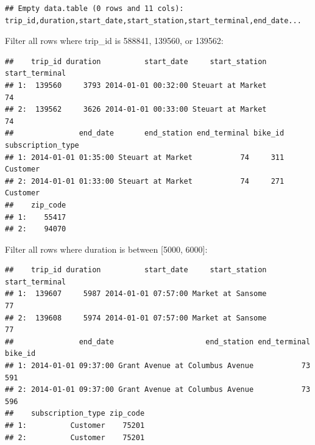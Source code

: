 \documentclass[]{book}
\newenvironment{Shaded}{\begin{snugshade}}{\end{snugshade}}
\newcommand{\DecValTok}[1]{\textcolor[rgb]{0.00,0.00,0.81}{#1}}
\newcommand{\KeywordTok}[1]{\textcolor[rgb]{0.13,0.29,0.53}{\textbf{#1}}}
\newcommand{\NormalTok}[1]{#1}
\newcommand{\OperatorTok}[1]{\textcolor[rgb]{0.81,0.36,0.00}{\textbf{#1}}}
\newcommand{\StringTok}[1]{\textcolor[rgb]{0.31,0.60,0.02}{#1}}
\begin{document}
\begin{verbatim}
## Empty data.table (0 rows and 11 cols): trip_id,duration,start_date,start_station,start_terminal,end_date...
\end{verbatim}

Filter all rows where trip\_id is 588841, 139560, or 139562:

\begin{Shaded}
\end{Shaded}

\begin{verbatim}
##    trip_id duration          start_date     start_station start_terminal
## 1:  139560     3793 2014-01-01 00:32:00 Steuart at Market             74
## 2:  139562     3626 2014-01-01 00:33:00 Steuart at Market             74
##               end_date       end_station end_terminal bike_id subscription_type
## 1: 2014-01-01 01:35:00 Steuart at Market           74     311          Customer
## 2: 2014-01-01 01:33:00 Steuart at Market           74     271          Customer
##    zip_code
## 1:    55417
## 2:    94070
\end{verbatim}

Filter all rows where duration is between {[}5000, 6000{]}:

\begin{Shaded}
\end{Shaded}

\begin{verbatim}
##    trip_id duration          start_date     start_station start_terminal
## 1:  139607     5987 2014-01-01 07:57:00 Market at Sansome             77
## 2:  139608     5974 2014-01-01 07:57:00 Market at Sansome             77
##               end_date                     end_station end_terminal bike_id
## 1: 2014-01-01 09:37:00 Grant Avenue at Columbus Avenue           73     591
## 2: 2014-01-01 09:37:00 Grant Avenue at Columbus Avenue           73     596
##    subscription_type zip_code
## 1:          Customer    75201
## 2:          Customer    75201
\end{verbatim}
\end{document}
